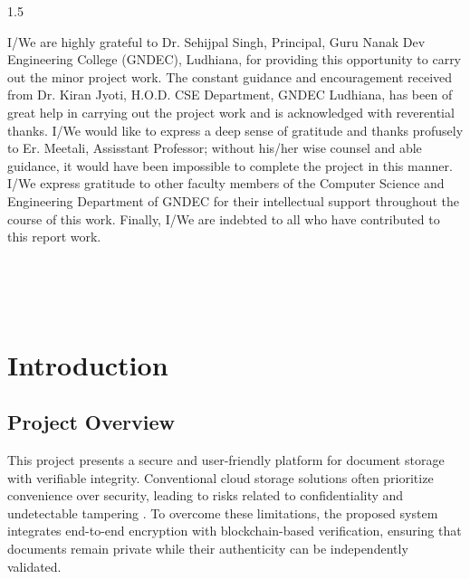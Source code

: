\documentclass[12pt]{article}
\begin{document}
\begin{spacing}{1.5}

\noindent I/We are highly grateful to Dr. Sehijpal Singh, Principal, Guru Nanak Dev Engineering College (GNDEC), Ludhiana, for providing this opportunity to carry out the minor project work. The constant guidance and encouragement received from Dr. Kiran Jyoti, H.O.D. CSE Department, GNDEC Ludhiana, has been of great help in carrying out the project work and is acknowledged with reverential thanks. I/We would like to express a deep sense of gratitude and thanks profusely to Er. Meetali, Assisstant Professor; without his/her wise counsel and able guidance, it would have been impossible to complete the project in this manner. I/We express gratitude to other faculty members of the Computer Science and Engineering Department of GNDEC for their intellectual support throughout the course of this work. Finally, I/We are indebted to all who have contributed to this report work.

\end{spacing}

\vspace{0.5cm}

\\

\\

\\

\newpage

\tableofcontents
\newpage
\listoffigures
\newpage

\clearpage

\setcounter{page}{1}
\newpage
\section{Introduction}

\subsection{Project Overview}

This project presents a secure and user-friendly platform for document storage with verifiable integrity. Conventional cloud storage solutions often prioritize convenience over security, leading to risks related to confidentiality and undetectable tampering \cite{stallings2017}. To overcome these limitations, the proposed system integrates end-to-end encryption with blockchain-based verification, ensuring that documents remain private while their authenticity can be independently validated.
\end{document}

